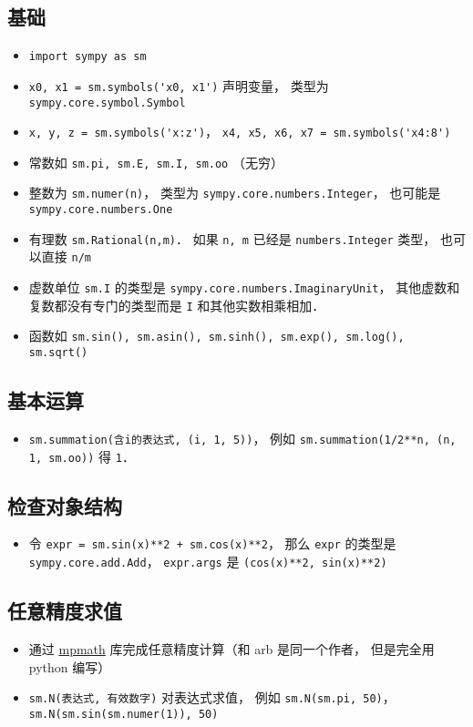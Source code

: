 
\begin{issues}
\issueDraft
\end{issues}


\subsection{基础}
\begin{itemize}
\item \verb|import sympy as sm|
\item \verb|x0, x1 = sm.symbols('x0, x1')| 声明变量， 类型为 \verb|sympy.core.symbol.Symbol|
\item \verb|x, y, z = sm.symbols('x:z')|， \verb|x4, x5, x6, x7 = sm.symbols('x4:8')|
\item 常数如 \verb|sm.pi, sm.E, sm.I, sm.oo| （无穷）
\item 整数为 \verb|sm.numer(n)|， 类型为 \verb|sympy.core.numbers.Integer|， 也可能是 \verb|sympy.core.numbers.One|
\item 有理数 \verb|sm.Rational(n,m)|． 如果 \verb|n, m| 已经是 \verb|numbers.Integer| 类型， 也可以直接 \verb|n/m|
\item 虚数单位 \verb|sm.I| 的类型是 \verb|sympy.core.numbers.ImaginaryUnit|， 其他虚数和复数都没有专门的类型而是 \verb|I| 和其他实数相乘相加．
\item 函数如 \verb|sm.sin(), sm.asin(), sm.sinh(), sm.exp(), sm.log(), sm.sqrt()|
\end{itemize}

\subsection{基本运算}
\begin{itemize}
\item \verb|sm.summation(含i的表达式, (i, 1, 5))|， 例如 \verb|sm.summation(1/2**n, (n, 1, sm.oo))| 得 \verb|1|．
\end{itemize}

\subsection{检查对象结构}
\begin{itemize}
\item 令 \verb|expr = sm.sin(x)**2 + sm.cos(x)**2|， 那么 \verb|expr| 的类型是 \verb|sympy.core.add.Add|， \verb|expr.args| 是 \verb|(cos(x)**2, sin(x)**2)|
\end{itemize}


\subsection{任意精度求值}
\begin{itemize}
\item 通过 \href{https://mpmath.org/}{mpmath} 库完成任意精度计算（和 arb 是同一个作者， 但是完全用 python 编写）
\item \verb|sm.N(表达式, 有效数字)| 对表达式求值， 例如 \verb|sm.N(sm.pi, 50)|， \verb|sm.N(sm.sin(sm.numer(1)), 50)|
\end{itemize}

